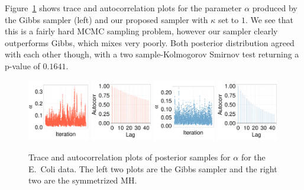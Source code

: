  Figure~\ref{fig:TRACE_ECOLI} shows trace and autocorrelation plots for the parameter $\alpha$ produced by the Gibbs sampler (left) and our proposed sampler with $\kappa$ set to $1$.
  We see that this is a fairly hard MCMC sampling problem, however our sampler clearly outperforms Gibbs, which mixes very poorly.
  Both posterior distribution agreed with each other though, with a two sample-Kolmogorov Smirnov test returning a p-value of $ 0.1641$. 
  \begin{figure}[H]
  \centering
  \begin{minipage}[!hp]{0.99\linewidth}
    \includegraphics [width=0.24\textwidth, angle=0]{figs/ecoli_ks/ecoli_alphatraceGBS_31_3_0_.pdf}
    \includegraphics [width=0.24\textwidth, angle=0]{figs/ecoli_ks/ecoli_alphagbsacf_31_3_0_.pdf}
    \includegraphics [width=0.24\textwidth, angle=0]{figs/ecoli_ks/ecoli_alphatraceMH_31_3_0_.pdf}
    \includegraphics [width=0.24\textwidth, angle=0]{figs/ecoli_ks/ecoli_alphamhacf_31_3_0_.pdf}
  \end{minipage}

    \caption{Trace and autocorrelation plots of posterior samples for $\alpha$ for the E.\ Coli data. The left two plots are the Gibbs sampler and the right two are the symmetrized MH. }
     \label{fig:TRACE_ECOLI}
  \end{figure}
